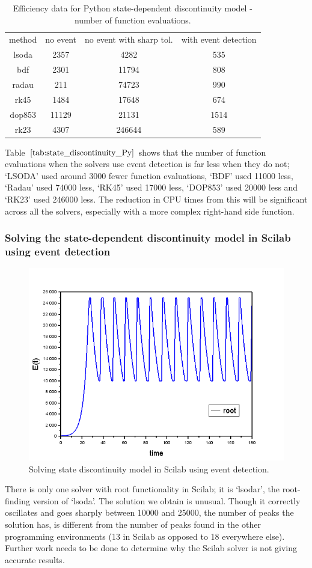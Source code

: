 \begin{table}[h]
\caption {Efficiency data for Python state-dependent discontinuity model - number of function evaluations.} \label{tab:state_discontinuity_Py}
\begin{center}
\begin{tabular}{ c c c c } 
method & no event & no event with sharp tol. & with event detection \\ 
lsoda & 2357 & 4282 & 535 \\
bdf & 2301 & 11794 & 808 \\
radau & 211 & 74723 & 990 \\
rk45 & 1484 & 17648 & 674 \\
dop853 & 11129 & 21131 & 1514 \\
rk23 & 4307 & 246644 & 589 \\
\end{tabular}
\end{center}
\end{table}

Table $\ref{tab:state_discontinuity_Py}$ shows that the number of function evaluations when the solvers use event detection is far less when they do not; `LSODA' used around 3000 fewer function evaluations, `BDF' used 11000 less, `Radau' used 74000 less, `RK45' used 17000 less, `DOP853' used 20000 less and `RK23' used 246000 less. The reduction in CPU times from this will be significant across all the solvers, especially with a more complex right-hand side function.

\subsubsection{Solving the state-dependent discontinuity model in Scilab using event detection}
\begin{figure}[H]
\centering
\includegraphics[width=0.7\linewidth]{./figures/solve_state_discontinuity_scilab}
\caption{Solving state discontinuity model in Scilab using event detection.}
\label{fig:solve_state_discontinuity_scilab}
\end{figure}
There is only one solver with root functionality in Scilab; it is `lsodar', the root-finding version of `lsoda'. The solution we obtain is unusual. Though it correctly oscillates and goes sharply between 10000 and 25000, the number of peaks the solution has, is different from the number of peaks found in the other programming environments (13 in Scilab as opposed to 18 everywhere else). Further work needs to be done to determine why the Scilab solver is not giving accurate results.

